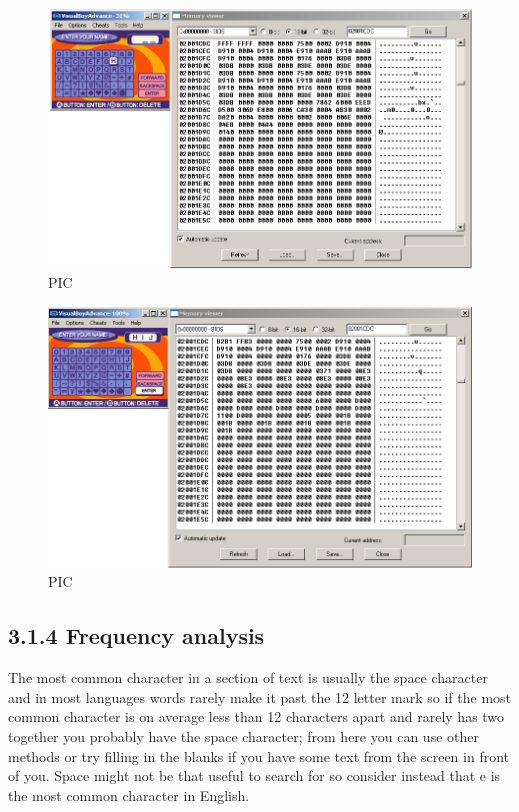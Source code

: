\documentclass[
]{book}
\begin{document}
\begin{figure}
\centering
\includegraphics{images/93_home_fast6191_romhackingguide_unrenamed_file___inal_borders_romhackguidetextmemoryviewing1.png}
\caption{PIC}
\end{figure}

\begin{figure}
\centering
\includegraphics{images/94_home_fast6191_romhackingguide_unrenamed_file___inal_borders_romhackguidetextmemoryviewing2.png}
\caption{PIC}
\end{figure}

\hypertarget{frequency-analysis}{%
\subsection{3.1.4 Frequency analysis}\label{frequency-analysis}}

The most common character in a section of text is usually the space character and in most languages words rarely make it past the 12 letter mark so if the most common character is on average less than 12 characters apart and rarely has two together you probably have the space character; from here you can use other methods or try filling in the blanks if you have some text from the screen in front of you. Space might not be that useful to search for so consider instead that e is the most common character in English.
\end{document}
